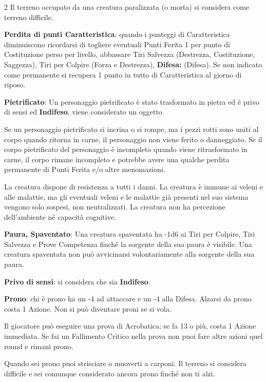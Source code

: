 \begin{multicols}{2}
Il terreno occupato da una creatura paralizzata (o morta) si considera come terreno difficile.

\textbf{Perdita di punti Caratteristica}: quando i punteggi di Caratteristica diminuiscono ricordarsi di togliere eventuali Punti Ferita 1 per punto di Costituzione perso per livello, abbassare Tiri Salvezza (Destrezza, Costituzione, Saggezza), Tiri per Colpire (Forza e Destrezza), \textbf{Difesa:} (Difesa). Se non indicato come permanente si recupera 1 punto in tutto di Caratteristica al giorno di riposo.

\textbf{Pietrificato}: Un personaggio pietrificato è stato trasformato in pietra ed è privo di sensi ed \textbf{Indifeso}, viene considerato un oggetto.

Se un personaggio pietrificato si incrina o si rompe, ma i pezzi rotti sono uniti al corpo quando ritorna in carne, il personaggio non viene ferito o danneggiato. Se il corpo pietrificato del personaggio è incompleto quando viene ritrasformato in carne, il corpo rimane incompleto e potrebbe avere una qualche perdita permanente di Punti Ferita e/o altre menomazioni.

La creatura dispone di resistenza a tutti i danni. La creatura è immune ai veleni e alle malattie, ma gli eventuali veleni e le malattie già presenti nel suo sistema vengono solo sospesi, non neutralizzati. La creatura non ha percezione dell'ambiente né capacità cognitive.

\textbf{Paura, Spaventato}:\hypertarget{condizionepaura}{}
Una creatura spaventata ha -1d6 ai Tiri per Colpire, Tiri Salvezza e Prove Competenza finché la sorgente della sua paura è visibile. Una creatura spaventata non può avvicinarsi volontariamente alla sorgente della sua paura.

\textbf{Privo di sensi}: si considera che sia \textbf{Indifeso}.

\textbf{Prono}: chi è prono ha un -4 ad attaccare e un -4 alla Difesa. Alzarsi da prono costa 1 Azione. Non si può diventare proni se si vola.

Il giocatore può eseguire una prova di Acrobatica; se fa 13 o più, costa 1 Azione immediata. Se fai un Fallimento Critico nella prova non puoi fare altre azioni quel round e rimani prono.

Quando sei prono puoi strisciare o muoverti a carponi. Il terreno si considera difficile e sei comunque considerato ancora prono finché non ti alzi.


\end{multicols}
